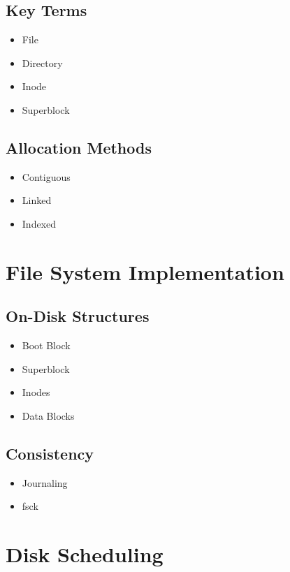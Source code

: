 \subsection*{Key Terms}

\begin{itemize}
\item File
\item Directory
\item Inode
\item Superblock
\end{itemize}

\subsection*{Allocation Methods}

\begin{itemize}
\item Contiguous
\item Linked
\item Indexed
\end{itemize}

\section{File System Implementation}

\subsection*{On-Disk Structures}

\begin{itemize}
\item Boot Block
\item Superblock
\item Inodes
\item Data Blocks
\end{itemize}

\subsection*{Consistency}

\begin{itemize}
\item Journaling
\item fsck
\end{itemize}

\section{Disk Scheduling}

